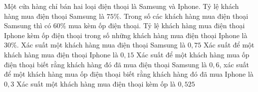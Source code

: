 \begin{ex}%
	Một cửa  hàng chỉ bán hai loại điện thoại là Samsung và Iphone. Tỷ lệ khách hàng mua điện thoại Samsung là $75\%$. Trong số các khách hàng mua điện thoại Samsung thì có $60\%$ mua kèm ốp điện thoại. Tỷ lệ khách hàng mua điện thoại Iphone kèm ốp điện thoại trong số những khách hàng mua điện thoại Iphone là $30\%$.
	\choiceTF 
		{\True Xác  suất một khách hàng mua điện thoại Samsung là $0{,}75$}
		{Xác suất  để một khách hàng mua điện thoại Iphone là $0{,}15$}
		{\True Xác suất để một khách hàng mua ốp điện thoại biết rằng khách hàng đó đã mua điện  thoại Samsung là $0{,}6$, xác suất để một khách hàng mua ốp điện thoại biết rằng khách hàng đó đã mua Iphone là $0{,}3$}
		{\True Xác suất một khách hàng  mua điện thoại kèm ốp là $0{,}525$}
\end{ex}

